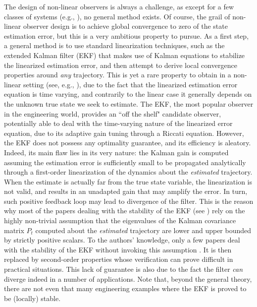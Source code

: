 \documentclass[a4paper,12pt,onecolumn]{article}
\begin{document}
The design of non-linear observers is always a challenge, as except for a few classes of systems  (e.g.,  \cite{Gauthier-Kupka-book01}), no general method exists. Of course, the grail of non-linear observer design is to achieve global convergence  to zero of the state estimation error, but this is a very ambitious property to pursue. As a first step, a general method is to use standard linearization techniques, such as the extended Kalman filter (EKF) that makes use of Kalman equations to stabilize the linearized estimation error, and then attempt to derive local convergence properties around \emph{any} trajectory. This is yet a rare property to obtain in a non-linear setting (see, e.g., \cite{aghannan-rouchon-ieee03}), due to the fact that the linearized estimation error equation is time varying, and contrarily to the linear case it generally depends on the unknown true state we seek to estimate.  The EKF,  the most popular observer in the engineering world, provides an ``off the shelf" candidate observer, potentially able to deal with the time-varying nature of the linearized error equation, due to its adaptive gain tuning through a Riccati equation.  However, the EKF does not possess any optimality guarantee, and its efficiency is aleatory. Indeed, its main flaw lies in its very nature: the Kalman gain is computed assuming the estimation error is sufficiently small to be propagated analytically through a first-order linearization of the dynamics about the \emph{estimated} trajectory. When the estimate is actually far from the true state variable, the linearization is not valid, and results in an unadapted gain that may amplify the error. In turn, such positive feedback loop may lead to divergence of the filter. This is the reason why most of the papers dealing with the stability of the EKF (see \cite{boutayeb,song-grizzle-95,reif,bonnabel2012contraction}) rely on the highly non-trivial assumption that the eigenvalues of the Kalman covariance matrix $P_t$ computed about the \emph{estimated} trajectory are lower and upper bounded by strictly positive scalars.  To the authors' knowledge, only a few papers deal with the stability of the EKF without invoking this assumption \cite{krener2003convergence}. It is then replaced by second-order properties whose verification can prove difficult in practical situations. This lack of guarantee is also due to the fact the filter \emph{can} diverge indeed in a number of applications. Note that,  beyond the general theory, there are not even that many engineering examples where the EKF is proved to be (locally) stable. 
\end{document}
